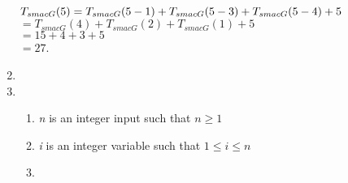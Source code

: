 \documentclass{article}
\begin{document}
\begin{enumerate}
    $T_{smacG}(5)\\
    = T_{smacG}(5-1) + T_{smacG}(5-3) + T_{smacG}(5-4) + 5$\\
    $= T_{smacG}(4) + T_{smacG}(2) + T_{smacG}(1) + 5$ \\
    $= 15 + 4 + 3 + 5$ \\
    $= 27$.
    
    \item
    
    \item 
    \begin{enumerate}
        \item \textit{n} is an integer input such that $n \geq 1$
        \item \textit{i} is an integer variable such that $1 \leq i \leq n$
        \item 
    \end{enumerate}
    
\end{enumerate}
    
\end{document}
